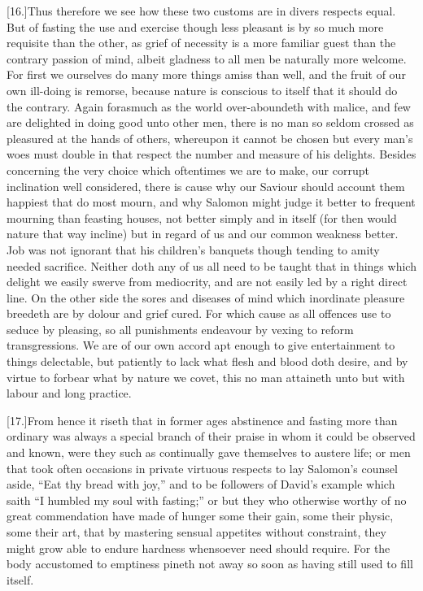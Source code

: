 [16.]Thus therefore we see how these two customs are in divers respects equal. But of fasting the use and exercise though less pleasant is by so much more requisite than the other, as grief of necessity is a more familiar guest than the contrary passion of mind, albeit gladness to all men be naturally more welcome. For first we ourselves do many more things amiss than well, and the fruit of our own ill-doing is remorse, because nature is conscious to itself that it should do the contrary. Again forasmuch as the world over-aboundeth with malice, and few are delighted in doing good unto other men, there is no man so seldom crossed as pleasured at the hands of others, whereupon it cannot be chosen but every man’s woes must double in that respect the number and measure of his delights. Besides concerning the very choice which oftentimes we are to make, our corrupt inclination well considered, there is cause why our Saviour should account them happiest that do most mourn, and why Salomon might judge it better to frequent mourning than feasting houses, not better simply and in itself (for then would nature that way incline) but in regard of us and our common weakness better. Job was not ignorant that his children’s banquets though tending to amity needed sacrifice. Neither doth  any of us all need to be taught that in things which delight we easily swerve from mediocrity, and are not easily led by a right direct line.
 On the other side the sores and diseases of mind which inordinate pleasure breedeth are by dolour and grief cured. For which cause as all offences use to seduce by pleasing, so all punishments endeavour by vexing to reform transgressions. We are of our own accord apt enough to give entertainment to things delectable, but patiently to lack what flesh and blood doth desire, and by virtue to forbear what by nature we covet, this no man attaineth unto but with labour and long practice.

[17.]From hence it riseth that in former ages abstinence and fasting more than ordinary was always a special branch of their praise in whom it could be observed and known, were they such as continually gave themselves to austere life; or men that took often occasions in private virtuous respects to lay Salomon’s counsel aside, “Eat thy bread with joy,” and to be followers of David’s example which saith “I humbled my soul with fasting;” or but they who otherwise worthy of no great commendation have made of hunger some their gain, some their physic, some their art, that by mastering sensual appetites without constraint, they might grow able to endure hardness whensoever need should require. For the body accustomed to emptiness pineth not away so soon as having still used to fill itself.

